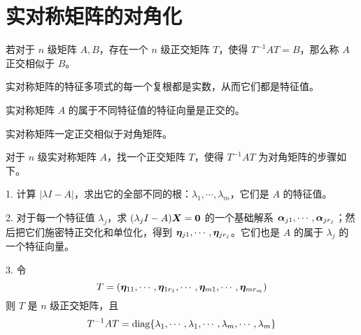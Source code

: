 \section{实对称矩阵的对角化}

若对于 $n$ 级矩阵 $A,B$，存在一个 $n$ 级正交矩阵 $T$，使得 $T^{-1}AT=B$，那么称 $A$ 正交相似于 $B$。

\begin{theorem}
    实对称矩阵的特征多项式的每一个复根都是实数，从而它们都是特征值。
\end{theorem}

\begin{theorem}
    实对称矩阵 $A$ 的属于不同特征值的特征向量是正交的。
\end{theorem}

\begin{theorem}
    实对称矩阵一定正交相似于对角矩阵。
\end{theorem}

对于 $n$ 级实对称矩阵 $A$，找一个正交矩阵 $T$，使得 $T^{-1}AT$ 为对角矩阵的步骤如下。

1. 计算 $|\lambda I- A|$，求出它的全部不同的根：$\lambda_1,\cdots,\lambda_m$，它们是 $A$ 的特征值。

2. 对于每一个特征值 $\lambda_j$，求 $(\lambda_jI-A)\boldsymbol{X} = \boldsymbol{0}$ 的一个基础解系 $\boldsymbol{\alpha}_{j1},\cdots,\boldsymbol{\alpha}_{jr_j}$；然后把它们施密特正交化和单位化，得到 $\boldsymbol{\eta}_{j1},\cdots,\boldsymbol{\eta}_{jr_j}$。它们也是 $A$ 的属于 $\lambda_j$ 的一个特征向量。

3. 令
$$T=(\boldsymbol{\eta}_{11},\cdots,\boldsymbol{\eta}_{1r_1},\cdots,\boldsymbol{\eta}_{m1},\cdots,\boldsymbol{\eta}_{mr_m})$$
则 $T$ 是 $n$ 级正交矩阵，且
$$T^{-1}AT = \operatorname{diag}\{\lambda_{1},\cdots,\lambda_{1},\cdots,\lambda_{m},\cdots,\lambda_{m}\}$$